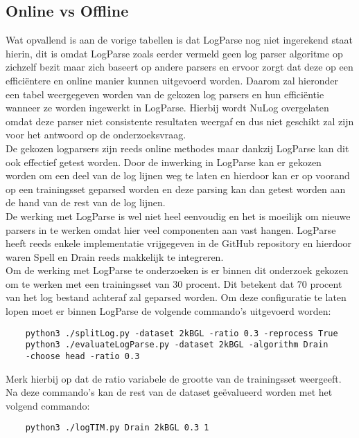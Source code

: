 \subsection{Online vs Offline}
\label{subsection:OnlineOffline}
Wat opvallend is aan de vorige tabellen is dat LogParse nog niet ingerekend staat hierin, dit is omdat LogParse zoals eerder vermeld geen log parser algoritme op zichzelf bezit maar zich baseert op andere parsers en ervoor zorgt dat deze op een efficiëntere en online manier kunnen uitgevoerd worden. Daarom zal hieronder een tabel weergegeven worden van de gekozen log parsers en hun efficiëntie wanneer ze worden ingewerkt in LogParse. Hierbij wordt NuLog overgelaten omdat deze parser niet consistente resultaten weergaf en dus niet geschikt zal zijn voor het antwoord op de onderzoeksvraag.\\

De gekozen logparsers zijn reeds online methodes maar dankzij LogParse kan dit ook effectief getest worden. Door de inwerking in LogParse kan er gekozen worden om een deel van de log lijnen weg te laten en hierdoor kan er op voorand op een trainingsset geparsed worden en deze parsing kan dan getest worden aan de hand van de rest van de log lijnen.\\

De werking met LogParse is wel niet heel eenvoudig en het is moeilijk om nieuwe parsers in te werken omdat hier veel componenten aan vast hangen. LogParse heeft reeds enkele implementatie vrijgegeven in de GitHub repository en hierdoor waren Spell en Drain reeds makkelijk te integreren.\\

Om de werking met LogParse te onderzoeken is er binnen dit onderzoek gekozen om te werken met een trainingsset van 30 procent. Dit betekent dat 70 procent van het log bestand achteraf zal geparsed worden. Om deze configuratie te laten lopen moet er binnen LogParse de volgende commando's uitgevoerd worden:
\begin{verbatim}
    python3 ./splitLog.py -dataset 2kBGL -ratio 0.3 -reprocess True
    python3 ./evaluateLogParse.py -dataset 2kBGL -algorithm Drain
    -choose head -ratio 0.3
\end{verbatim}
Merk hierbij op dat de ratio variabele de grootte van de trainingsset weergeeft. Na deze commando's kan de rest van de dataset geëvalueerd worden met het volgend commando:
\begin{verbatim}
    python3 ./logTIM.py Drain 2kBGL 0.3 1
\end{verbatim}

